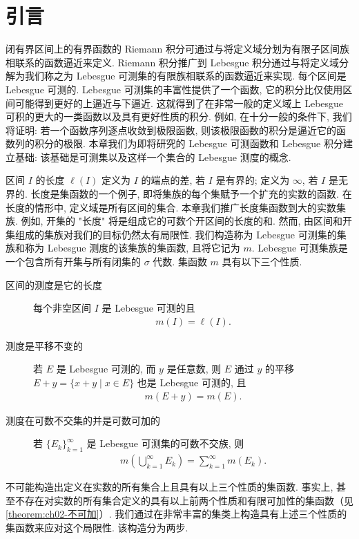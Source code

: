 \documentclass[../../main.tex]{subfiles}
\begin{document}
\section{引言}\label{section:ch02-引言}

闭有界区间上的有界函数的 Riemann 积分可通过与将定义域分划为有限子区间族相联系的函数逼近来定义. Riemann 积分推广到 Lebesgue 积分通过与将定义域分解为我们称之为 Lebesgue 可测集的有限族相联系的函数逼近来实现. 每个区间是 Lebesgue 可测的. Lebesgue 可测集的丰富性提供了一个函数, 它的积分比仅使用区间可能得到更好的上逼近与下逼近. 这就得到了在非常一般的定义域上 Lebesgue 可积的更大的一类函数以及具有更好性质的积分. 例如, 在十分一般的条件下, 我们将证明: 若一个函数序列逐点收敛到极限函数, 则该极限函数的积分是逼近它的函数列的积分的极限. 本章我们为即将研究的 Lebesgue 可测函数和 Lebesgue 积分建立基础: 该基础是可测集以及这样一个集合的 Lebesgue 测度的概念.

区间 $I$ 的长度 $\ell(I)$ 定义为 $I$ 的端点的差, 若 $I$ 是有界的; 定义为 $\infty$, 若 $I$ 是无界的. 长度是集函数的一个例子, 即将集族的每个集赋予一个扩充的实数的函数. 在长度的情形中, 定义域是所有区间的集合. 本章我们推广长度集函数到大的实数集族. 例如, 开集的 "长度" 将是组成它的可数个开区间的长度的和. 然而, 由区间和开集组成的集族对我们的目标仍然太有局限性. 我们构造称为 Lebesgue 可测集的集族和称为 Lebesgue 测度的该集族的集函数, 且将它记为 $m$. Lebesgue 可测集族是一个包含所有开集与所有闭集的 $\sigma$ 代数. 集函数 $m$ 具有以下三个性质.

\begin{description}
\item[区间的测度是它的长度] 每个非空区间 $I$ 是 Lebesgue 可测的且
\begin{align*}
m(I)=\ell(I).
\end{align*}
\item[测度是平移不变的] 若 $E$ 是 Lebesgue 可测的, 而 $y$ 是任意数, 则 $E$ 通过 $y$ 的平移 $E+y=\{x+y\mid x\in E\}$ 也是 Lebesgue 可测的, 且
\begin{align*}
m(E+y)=m(E).
\end{align*}
\item[测度在可数不交集的并是可数可加的] 若 $\{E_{k}\}_{k=1}^{\infty}$ 是 Lebesgue 可测集的可数不交族, 则
\begin{align*}
m\left(\bigcup_{k=1}^{\infty}E_{k}\right)=\sum_{k=1}^{\infty}m(E_{k}).
\end{align*}
\end{description}

不可能构造出定义在实数的所有集合上且具有以上三个性质的集函数. 事实上, 甚至不存在对实数的所有集合定义的具有以上前两个性质和有限可加性的集函数（见\cref{theorem:ch02-不可加}）. 我们通过在非常丰富的集类上构造具有上述三个性质的集函数来应对这个局限性. 该构造分为两步.
\end{document}
